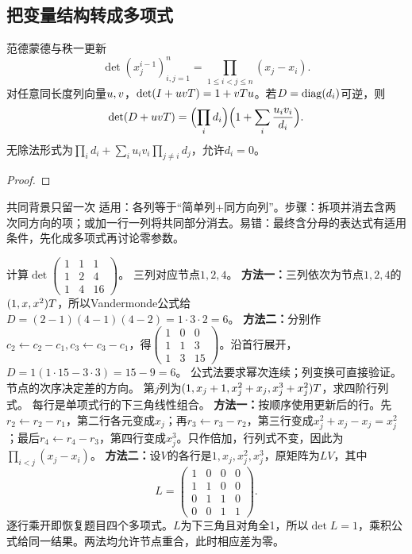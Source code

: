 \subsection{把变量结构转成多项式}
\begin{theorem}{范德蒙德与秩一更新}
\begin{equation}
\det(x_j^{i-1})_{i,j=1}^n=\prod_{1\le i<j\le n}(x_j-x_i).\label{eq:vander}
\end{equation}
对任意同长度列向量$u,v$，$\det(I+uvT)=1+vTu$。若$D=\operatorname{diag}(d_i)$可逆，则
\begin{equation}\det(D+uvT)=\Bigl(\prod_i d_i\Bigr)\Bigl(1+\sum_i \dfrac{u_iv_i}{d_i}\Bigr).\label{eq:rankone}\end{equation}
无除法形式为$\prod_i d_i+\sum_i u_iv_i\prod_{j\ne i}d_j$，允许$d_i=0$。
\end{theorem}
\begin{proof}

\end{proof}
\begin{method}{共同背景只留一次}
适用：各列等于“简单列+同方向列”。步骤：拆项并消去含两次同方向的项；或加一行一列将共同部分消去。易错：最终含分母的表达式有适用条件，先化成多项式再讨论零参数。
\end{method}
{计算$\det\begin{pmatrix}1&1&1\\1&2&4\\1&4&16\end{pmatrix}$。}
{三列对应节点$1,2,4$。}
{\textbf{方法一：}三列依次为节点$1,2,4$的$(1,x,x^2)T$，所以Vandermonde公式给
$D=(2-1)(4-1)(4-2)=1\cdot3\cdot2=6$。
\textbf{方法二：}分别作$c_2\leftarrow c_2-c_1,c_3\leftarrow c_3-c_1$，得$\begin{pmatrix}1&0&0\\1&1&3\\1&3&15\end{pmatrix}$。沿首行展开，$D=1(1\cdot15-3\cdot3)=15-9=6$。}
{公式法要求幂次连续；列变换可直接验证。}
{节点的次序决定差的方向。}
{第$j$列为$(1,x_j+1,x_j^2+x_j,x_j^3+x_j^2)T$，求四阶行列式。}
{每行是单项式行的下三角线性组合。}
{\textbf{方法一：}按顺序使用更新后的行。先$r_2\leftarrow r_2-r_1$，第二行各元变成$x_j$；再$r_3\leftarrow r_3-r_2$，第三行变成$x_j^2+x_j-x_j=x_j^2$；最后$r_4\leftarrow r_4-r_3$，第四行变成$x_j^3$。只作倍加，行列式不变，因此为$\prod_{i<j}(x_j-x_i)$。
\textbf{方法二：}设$V$的各行是$1,x_j,x_j^2,x_j^3$，原矩阵为$LV$，其中
\[L=\begin{pmatrix}1&0&0&0\\1&1&0&0\\0&1&1&0\\0&0&1&1\end{pmatrix}.\]
逐行乘开即恢复题目四个多项式。$L$为下三角且对角全1，所以$\det L=1$，乘积公式给同一结果。两法均允许节点重合，此时相应差为零。}
